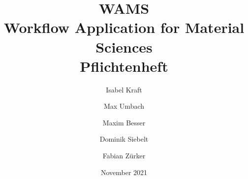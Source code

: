\documentclass[paper=a4, fontsize = 12pt, DIV = calc, twoside=off, parskip=full, numbers=noenddot]{scrbook}
\title{{WAMS}\\
{\Large{Workflow Application for Material Sciences}}\\
{Pflichtenheft}}
\author{Isabel Kraft \and Max Umbach 
        \and Maxim Besser \and Dominik Siebelt \and Fabian Zürker}
\date{November 2021}
\begin{document}
\maketitle

\newpage
\tableofcontents
\newpage














\printglossary
\end{document}
